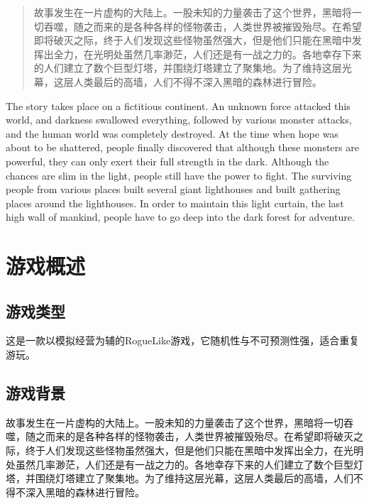 \documentclass[UTF8,AutoFakeBold=1,AutoFakeSlant,zihao=-4]{cucthesis}
\begin{document}
\coverpage

\begin{abstract}
故事发生在一片虚构的大陆上。一股未知的力量袭击了这个世界，黑暗将一切吞噬，随之而来的是各种各样的怪物袭击，人类世界被摧毁殆尽。在希望即将破灭之际，终于人们发现这些怪物虽然强大，但是他们只能在黑暗中发挥出全力，在光明处虽然几率渺茫，人们还是有一战之力的。各地幸存下来的人们建立了数个巨型灯塔，并围绕灯塔建立了聚集地。为了维持这层光幕，这层人类最后的高墙，人们不得不深入黑暗的森林进行冒险。
\end{abstract}

\begin{abstractEN}
The story takes place on a fictitious continent. An unknown force attacked this world, and darkness swallowed everything, followed by various monster attacks, and the human world was completely destroyed. At the time when hope was about to be shattered, people finally discovered that although these monsters are powerful, they can only exert their full strength in the dark. Although the chances are slim in the light, people still have the power to fight. The surviving people from various places built several giant lighthouses and built gathering places around the lighthouses. In order to maintain this light curtain, the last high wall of mankind, people have to go deep into the dark forest for adventure.
\end{abstractEN}

\contentpage

\section{游戏概述}

\subsection{游戏类型}
这是一款以模拟经营为辅的RogueLike游戏，它随机性与不可预测性强，适合重复游玩。

\subsection{游戏背景}
故事发生在一片虚构的大陆上。一股未知的力量袭击了这个世界，黑暗将一切吞噬，随之而来的是各种各样的怪物袭击，人类世界被摧毁殆尽。在希望即将破灭之际，终于人们发现这些怪物虽然强大，但是他们只能在黑暗中发挥出全力，在光明处虽然几率渺茫，人们还是有一战之力的。各地幸存下来的人们建立了数个巨型灯塔，并围绕灯塔建立了聚集地。为了维持这层光幕，这层人类最后的高墙，人们不得不深入黑暗的森林进行冒险。
\end{document}
